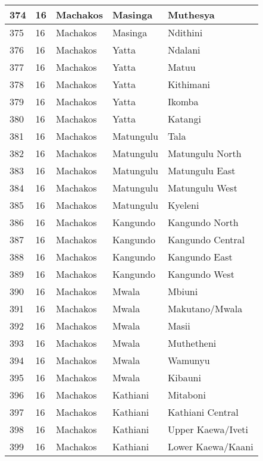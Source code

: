 \begin{table}[!ht]
\begin{tabular}{|l|l|l|l|l|}
        374 & 16 & Machakos & Masinga & Muthesya \\ \hline
        375 & 16 & Machakos & Masinga & Ndithini \\ \hline
        376 & 16 & Machakos & Yatta & Ndalani \\ \hline
        377 & 16 & Machakos & Yatta & Matuu \\ \hline
        378 & 16 & Machakos & Yatta & Kithimani \\ \hline
        379 & 16 & Machakos & Yatta & Ikomba \\ \hline
        380 & 16 & Machakos & Yatta & Katangi \\ \hline
        381 & 16 & Machakos & Matungulu & Tala \\ \hline
        382 & 16 & Machakos & Matungulu & Matungulu North \\ \hline
        383 & 16 & Machakos & Matungulu & Matungulu East \\ \hline
        384 & 16 & Machakos & Matungulu & Matungulu West \\ \hline
        385 & 16 & Machakos & Matungulu & Kyeleni \\ \hline
        386 & 16 & Machakos & Kangundo & Kangundo North \\ \hline
        387 & 16 & Machakos & Kangundo & Kangundo Central \\ \hline
        388 & 16 & Machakos & Kangundo & Kangundo East \\ \hline
        389 & 16 & Machakos & Kangundo & Kangundo West \\ \hline
        390 & 16 & Machakos & Mwala & Mbiuni \\ \hline
        391 & 16 & Machakos & Mwala & Makutano/Mwala \\ \hline
        392 & 16 & Machakos & Mwala & Masii \\ \hline
        393 & 16 & Machakos & Mwala & Muthetheni \\ \hline
        394 & 16 & Machakos & Mwala & Wamunyu \\ \hline
        395 & 16 & Machakos & Mwala & Kibauni \\ \hline
        396 & 16 & Machakos & Kathiani & Mitaboni \\ \hline
        397 & 16 & Machakos & Kathiani & Kathiani Central \\ \hline
        398 & 16 & Machakos & Kathiani & Upper Kaewa/Iveti \\ \hline
        399 & 16 & Machakos & Kathiani & Lower Kaewa/Kaani \\ \hline

\end{tabular}
\end{table}
